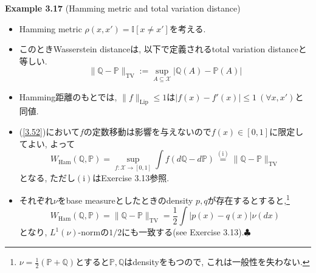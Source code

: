 \documentclass[aspectratio=169, dvipdfmx]{beamer}
\def\endexample{\hfill $\clubsuit$}
\begin{document}
\begin{frame}{}{}
{\bf Example 3.17} (Hamming metric and total variation distance)
\begin{itemize}
    \item Hamming metric $\rho(x, x') = \mathbb{I}[x \ne x']$を考える.
    \item このときWasserstein distanceは, 以下で定義されるtotal variation distanceと等しい.
    \[
        \|\mathbb{Q} - \mathbb{P}\|_{\mathrm{TV}}
        := \sup_{A \subseteq \mathcal{X}}|\mathbb{Q}(A) -\mathbb{P}(A)|
        \tag{3.53}\label{3.53}
    \]
    \item Hamming距離のもとでは,
    $\|f\|_{\mathrm{Lip}}\le 1$は$|f(x)-f'(x)|\le 1\ (\forall x,x')$と同値.
    \item (\ref{3.52})において$f$の定数移動は影響を与えないので$f(x) \in [0,1]$に限定してよい,
    よって
    \[
        W_\mathrm{Ham}(\mathbb{Q},\mathbb{P})
        = \sup_{f : \mathcal{X} \to [0,1]}\int f \left(d\mathbb{Q}-d\mathbb{P}\right)
        \stackrel{\mathrm{(i)}}{=} \| \mathbb{Q}-\mathbb{P} \|_{\mathrm{TV}}
    \]
    となる, ただし$\mathrm{(i)}$はExercise 3.13参照.
    \item それぞれ$\nu$をbase measureとしたときのdensity $p, q$が存在するとすると,\footnote{$\nu = \frac{1}{2}(\mathbb{P}+\mathbb{Q})$とすると$\mathbb{P},\mathbb{Q}$はdensityをもつので, これは一般性を失わない.}
    \[
        W_{\mathrm{Ham}}(\mathbb{Q}, \mathbb{P})
         = \|\mathbb{Q}-\mathbb{P}\|_{\mathrm{TV}}
         = \frac{1}{2}\int |p(x) - q(x)| \nu(dx)
    \]
    となり, $L^1(\nu)$-normの$1/2$にも一致する(see Exercise 3.13).\endexample
\end{itemize}
\end{frame}
\end{document}
